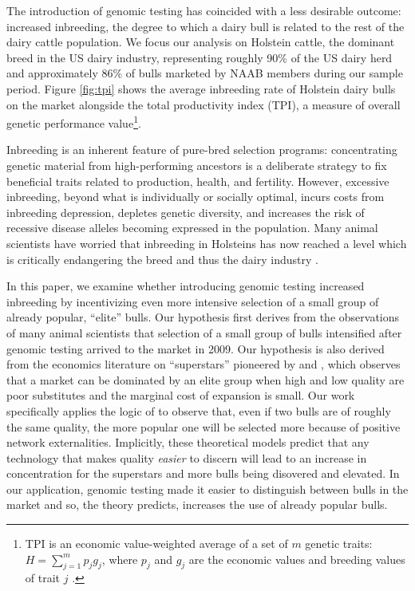 \documentclass[12pt,letterpaper]{article}
\begin{document}
The introduction of genomic testing has coincided with a less desirable outcome: increased inbreeding, the degree to which a dairy bull is related to the rest of the dairy cattle population. We focus our analysis on Holstein cattle, the dominant breed in the US dairy industry, representing roughly 90\% of the US dairy herd and approximately 86\% of bulls marketed by NAAB members during our sample period. Figure \ref{fig:tpi} shows the average inbreeding rate of Holstein dairy bulls on the market alongside the total productivity index (TPI), a measure of overall genetic performance value\footnote{TPI is an economic value-weighted average of a set of $m$ genetic traits: $H=\sum_{j=1}^{m}p_{j}g_{j}$, where $p_{j}$ and $g_{j}$ are the economic values and breeding values of trait $j$ \citep{Melton_Heady_Willham1979}.}.

Inbreeding is an inherent feature of pure-bred selection programs: concentrating genetic material from high-performing ancestors is a deliberate strategy to fix beneficial traits related to production, health, and fertility. However, excessive inbreeding, beyond what is individually or socially optimal, incurs costs from inbreeding depression, depletes genetic diversity, and increases the risk of recessive disease alleles becoming expressed in the population. Many animal scientists have worried that inbreeding in Holsteins has now reached a level which is critically endangering the breed and thus the dairy industry \citep{Cole2023,Makanjuola2020}.

In this paper, we examine whether introducing genomic testing increased inbreeding by incentivizing even more intensive selection of a small group of already popular, ``elite'' bulls. 
Our hypothesis first derives from the observations of many animal scientists \citep{scott_how_2021,howard_invited_2017,Cole2019,makanjuola_effect_2020} that selection of a small group of bulls intensified after genomic testing arrived to the market in 2009.
Our hypothesis is also derived from the economics literature on ``superstars'' pioneered by \citet{rosen_economics_1981} and \citet{adler1985stardom}, which observes that a market can be dominated by an elite group when high and low quality are poor substitutes and the marginal cost of expansion is small.
Our work specifically applies the logic of \citet{adler1985stardom} to observe that, even if two bulls are of roughly the same quality, the more popular one will be selected more because of positive network externalities.
Implicitly, these theoretical models predict that any technology that makes quality \textit{easier} to discern will lead to an increase in concentration for the superstars and more bulls being disovered and elevated.
In our application, genomic testing made it easier to distinguish between bulls in the market and so, the theory predicts, increases the use of already popular bulls.
\end{document}
